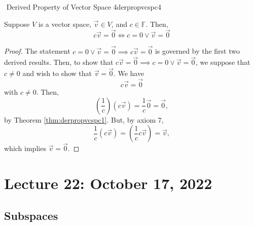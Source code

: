         \begin{theorem}{\Stop\,\,Derived Property of Vector Space 4}{derpropvcspc4}

            Suppose \(V\) is a vector space, \(\vec{v}\in V\), and \(c\in\mathbb{F}\). Then,
            \begin{equation*}
                c\vec{v}=\vec{0}\iff c=0\vee \vec{v}=\vec{0}
            \end{equation*}
            \begin{proof}
                The statement \(c=0\vee\vec{v}=\vec{0}\implies c\vec{v}=\vec{0}\) is governed by the first two derived results. Then, to show that \(c\vec{v}=\vec{0}\implies c=0\vee\vec{v}=\vec{0}\), we suppose that \(c\neq0\) and wish to show that \(\vec{v}=\vec{0}\). We have
                \begin{equation*}
                    c\vec{v}=\vec{0}
                \end{equation*}
                with \(c\neq0\). Then,
                \begin{equation*}
                    \left(\frac{1}{c}\right)(c\vec{v})=\frac{1}{c}\vec{0}=\vec{0},
                \end{equation*}
                by Theorem \ref{thm:derpropvcspc1}. But, by axiom \(7\), 
                \begin{equation*}
                    \frac{1}{c}(c\vec{v})=\left(\frac{1}{c}c\vec{v}\right)=\vec{v},
                \end{equation*}
                which implies \(\vec{v}=\vec{0}\).
            \end{proof}
        \end{theorem}

\pagebreak

\section{Lecture 22: October 17, 2022}

    \subsection{Subspaces}

